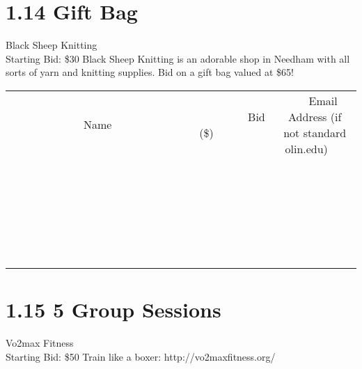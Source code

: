 \documentclass[11pt]{article}
\begin{document}
\section*{1.14 Gift Bag}
Black Sheep Knitting
\\
Starting Bid: \$30
\newline
Black Sheep Knitting is an adorable shop in Needham with all sorts of yarn and knitting supplies. Bid on a gift bag valued at \$65!
\\[6ex]
\begin{tabular}{c c c}
~~~~~~~~~~~~~Name~~~~~~~~~~~~~ & ~~~~~~~~~Bid (\$)~~~~~~~~~  & ~~~Email Address (if not standard olin.edu)~~~\\
 & & \\
\hline
 & & \\
\hline
 & & \\
\hline
 & & \\
\hline
 & & \\
\hline
 & & \\
\hline
 & & \\
\hline
 & & \\
\hline
 & & \\
\hline
 & & \\
\hline
 & & \\
\hline
 & & \\
\hline
 & & \\
\hline
 & & \\
\hline
 & & \\
\hline
 & & \\
\hline
 & & \\
\hline
 & & \\
\hline
 & & \\
\hline
 & & \\
\hline
 & & \\
\hline
 & & \\
\hline
 & & \\
\hline
 & & \\
\hline
 & & \\
\hline
 & & \\
\hline
\end{tabular}
\newpage
\section*{1.15 5 Group Sessions}
Vo2max Fitness
\\
Starting Bid: \$50
\newline
Train like a boxer: http://vo2maxfitness.org/
\end{document}
